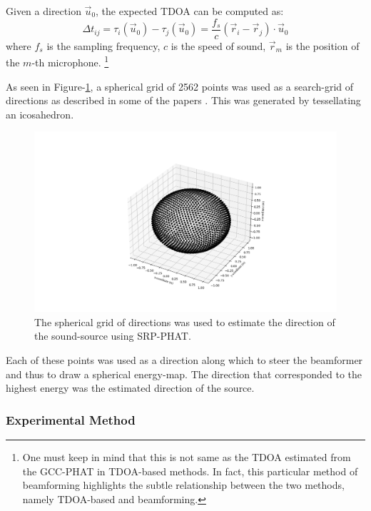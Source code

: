 \documentclass{report}
\begin{document}
Given a direction $\vec{u}_0$, the expected TDOA can be computed as:
\begin{equation}
\Delta t_{ij} = \tau_{i}(\vec{u}_0) - \tau_{j}(\vec{u}_0) = \frac{f_s}{c} \left( \vec{r}_i - \vec{r}_j \right) \cdot \vec{u}_0
\end{equation}
where $f_s$ is the sampling frequency, $c$ is the speed of sound, $\vec{r}_m$ is the position of the $m$-th microphone. \footnote{One must keep in mind that this is not same as the TDOA estimated from the GCC-PHAT in TDOA-based methods. In fact, this particular method of beamforming highlights the subtle relationship between the two methods, namely TDOA-based and beamforming.}

As seen in Figure-\ref{fig:srp_phat_grid}, a spherical grid of 2562 points was used as a search-grid of directions as described in some of the papers \cite{valin_localization_2004} \cite{valin_robust_2007}. This was generated by tessellating an icosahedron.

\begin{figure}[H]
\includegraphics[width=1\textwidth]{../Python/srp_phat/grid.png}
\centering
\caption{The spherical grid of directions was used to estimate the direction of the sound-source using SRP-PHAT.}
\label{fig:srp_phat_grid}
\centering
\end{figure}

Each of these points was used as a direction along which to steer the beamformer and thus to draw a spherical energy-map. The direction that corresponded to the highest energy was the estimated direction of the source.

\subsubsection{Experimental Method}
\end{document}
